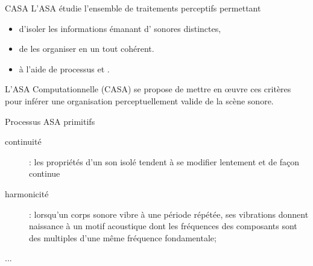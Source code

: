 \begin{frame}{CASA}
L'ASA étudie l'ensemble de traitements perceptifs permettant
\begin{itemize}
\item d'isoler les informations émanant d' sonores distinctes,
\item de les organiser en un tout cohérent.
\item à l'aide de processus  et .
\end{itemize}
L'ASA Computationnelle (CASA) se propose de mettre en \oe{}uvre ces critères pour inférer une organisation perceptuellement valide de la scène sonore.
\end{frame}

\begin{frame}{Processus ASA \og primitifs \fg}
\begin{description}
\item[\alert<2>{continuité}] : les propriétés d'un son isolé tendent à se modifier lentement et de façon continue
\item[harmonicité] : lorsqu'un corps sonore vibre à une période répétée, ses vibrations donnent naissance à un motif acoustique dont les fréquences des composants sont des multiples d'une même fréquence fondamentale;
\item[...]
\end{description}
\end{frame}

